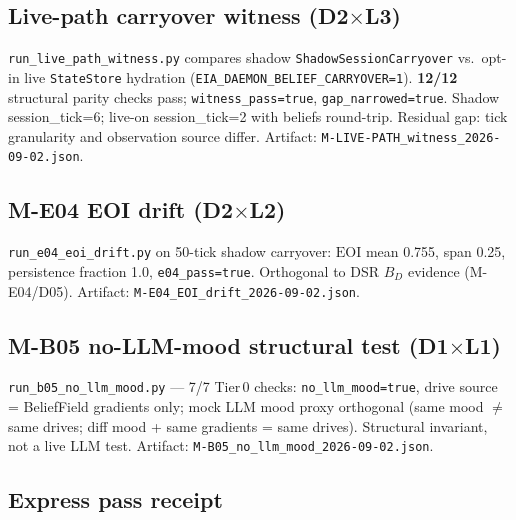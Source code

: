 \subsection{Live-path carryover witness (D2$\times$L3)}

\texttt{run\_live\_path\_witness.py} compares shadow \texttt{ShadowSessionCarryover} vs.\ opt-in live \texttt{StateStore} hydration (\texttt{EIA\_DAEMON\_BELIEF\_CARRYOVER=1}). \textbf{12/12} structural parity checks pass; \texttt{witness\_pass=true}, \texttt{gap\_narrowed=true}. Shadow session\_tick=6; live-on session\_tick=2 with beliefs round-trip. Residual gap: tick granularity and observation source differ. Artifact: \texttt{M-LIVE-PATH\_witness\_2026-09-02.json}.

\subsection{M-E04 EOI drift (D2$\times$L2)}

\texttt{run\_e04\_eoi\_drift.py} on 50-tick shadow carryover: $\mathrm{EOI}$ mean 0.755, span 0.25, persistence fraction 1.0, \texttt{e04\_pass=true}. Orthogonal to DSR $B_D$ evidence (M-E04/D05). Artifact: \texttt{M-E04\_EOI\_drift\_2026-09-02.json}.

\subsection{M-B05 no-LLM-mood structural test (D1$\times$L1)}

\texttt{run\_b05\_no\_llm\_mood.py} --- 7/7 Tier\,0 checks: \texttt{no\_llm\_mood=true}, drive source = BeliefField gradients only; mock LLM mood proxy orthogonal (same mood $\neq$ same drives; diff mood + same gradients = same drives). Structural invariant, not a live LLM test. Artifact: \texttt{M-B05\_no\_llm\_mood\_2026-09-02.json}.

\subsection{Express pass receipt}

